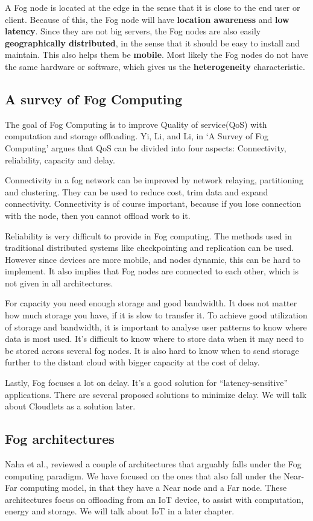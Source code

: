 A Fog node is located at the edge in the sense that it is close to the end user or client. Because of this, the Fog node will have \textbf{location awareness} and \textbf{low latency}. Since they are not big servers, the Fog nodes are also easily \textbf{geographically distributed}, in the sense that it should be easy to install and maintain. This also helps them be \textbf{mobile}. Most likely the Fog nodes do not have the same hardware or software, which gives us the \textbf{heterogeneity} characteristic. 

\subsection{A survey of Fog Computing}
The goal of Fog Computing is to improve Quality of service(QoS) with computation and storage offloading. Yi, Li, and Li, in ‘A Survey of Fog Computing’\cite{yi_survey_2015} argues that QoS can be divided into four aspects: Connectivity, reliability, capacity and delay.

Connectivity in a fog network can be improved by network relaying, partitioning and clustering. They can be used to reduce cost, trim data and expand connectivity. Connectivity is of course important, because if you lose connection with the node, then you cannot offload work to it. 

Reliability is very difficult to provide in Fog computing. The methods used in traditional distributed systems like checkpointing and replication can be used. However since devices are more mobile, and nodes dynamic, this can be hard to implement. It also implies that Fog nodes are connected to each other, which is not given in all architectures. 

For capacity you need enough storage and good bandwidth. It does not matter how much storage you have, if it is slow to transfer it. To achieve good utilization of storage and bandwidth, it is important to analyse user patterns to know where data is most used. It’s difficult to know where to store data when it may need to be stored across several fog nodes. It is also hard to know when to send storage further to the distant cloud with bigger capacity at the cost of delay. 

Lastly, Fog focuses a lot on delay. It’s a good solution for “latency-sensitive” applications. There are several proposed solutions to minimize delay. We will talk about Cloudlets as a solution later.

\subsection{Fog architectures}
Naha et al.\cite{naha_fog_2018}, reviewed a couple of architectures that arguably falls under the Fog computing paradigm. We have focused on the ones that also fall under the Near-Far computing model, in that they have a Near node and a Far node. These architectures focus on offloading from an IoT device, to assist with computation, energy and storage. We will talk about IoT in a later chapter. 

